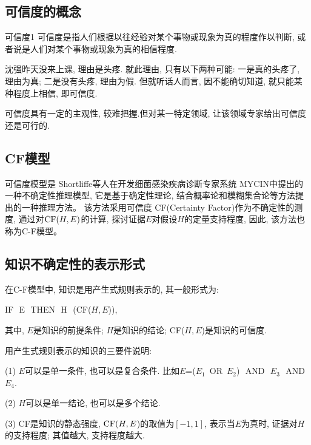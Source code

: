 \subsection{可信度的概念}
\begin{mydef}{可信度}{1}
    可信度是指人们根据以往经验对某个事物或现象为真的程度作以判断, 或者说是人们对某个事物或现象为真的相信程度.
\end{mydef}

\begin{example}
  沈强昨天没来上课, 理由是头疼. 就此理由, 只有以下两种可能: 一是真的头疼了, 理由为真; 二是没有头疼, 理由为假. 但就听话人而言, 因不能确切知道, 就只能某种程度上相信, 即可信度.
\end{example}

\begin{remark}
    可信度具有一定的主观性, 较难把握.但对某一特定领域, 让该领域专家给出可信度还是可行的.
\end{remark}
\subsection{CF模型}
可信度模型是 Shortliffe等人在开发细菌感染疾病诊断专家系统 MYCIN中提出的一种不确定性推理模型, 它是基于确定性理论, 结合概率论和模糊集合论等方法提出的一种推理方法。
该方法采用可信度 CF(Certainty Factor)作为不确定性的测度, 通过对$\textup{CF}(H,E)$的计算, 探讨证据$E$对假设$H$的定量支持程度, 因此, 该方法也称为C-F模型。
\subsection{知识不确定性的表示形式}
在C-F模型中, 知识是用产生式规则表示的, 其一般形式为:
\begin{center}
    IF\,\,   E\,\,    THEN\,\,  H\,\, (CF($H, E$)),
\end{center}
其中, $E$是知识的前提条件; $H$是知识的结论; CF($H, E$)是知识的可信度.
\begin{remark}
用产生式规则表示的知识的三要件说明:

(1) $E$可以是单一条件, 也可以是复合条件. 比如$E$=($E_1$\,  \textup{OR}\,  $E_2$)\,\,  \textup{AND}\,\,  $E_3$\,\, \textup{AND}\,\,  $E_4$.

(2) $H$可以是单一结论, 也可以是多个结论.

(3) \textup{CF}是知识的静态强度, $\textup{CF}(H, E$)的取值为$[-1, 1]$, 表示当$E$为真时, 证据对$H$的支持程度; 其值越大, 支持程度越大.
\end{remark}


